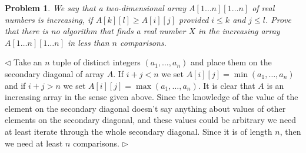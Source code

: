\documentclass[12pt]{article}
\newtheorem{problem}{Problem}[subsection]
\newenvironment{solution}{\par $\triangleleft$}{$\triangleright$}
\begin{document}
\begin{problem} We say that a two-dimensional array $A[1\ldots n][1\ldots n]$ of
real numbers is increasing, if $A[k][l]\geq A[i][j]$ provided $i\leq k$ and
$j\leq l$. Prove that there is no algorithm that finds a real number $X$ in the
increasing array $A[1\ldots n][1\ldots n]$ in less than $n$ comparisons.
\end{problem}
\begin{solution} Take an $n$ tuple of distinct integers $(a_1,\ldots,a_n)$ and
    place them on the secondary diagonal of array $A$. If $i+j<n$ we set
    $A[i][j]=\min(a_1,\ldots,a_n)$ and if $i+j>n$ we set
    $A[i][j]=\max(a_1,\ldots,a_n)$. It is clear that $A$ is an increasing array
    in the sense given above. Since the knowledge of the value of the element on
    the secondary diagonal doesn't say anything about values of other elements
    on the secondary diagonal, and these values could be arbitrary we need at
    least iterate through the whole secondary diagonal. Since it is of length
    $n$, then we need at least $n$ comparisons.
\end{solution}
\end{document}
